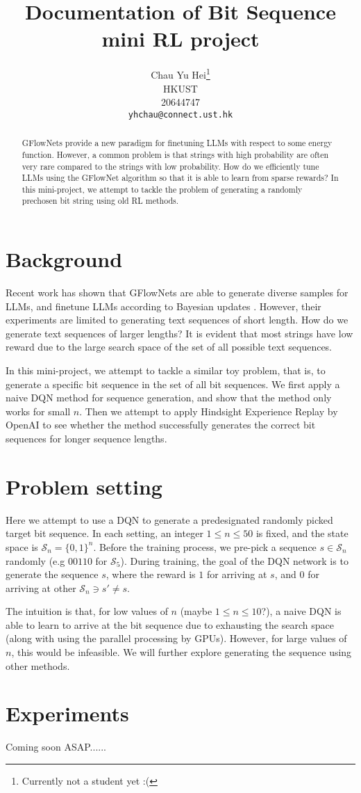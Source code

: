 \documentclass{article}
\title{Documentation of Bit Sequence mini RL project}
\author{%
  Chau Yu Hei\thanks{Currently not a student yet :(} \\
  HKUST\\
  20644747\\
  \texttt{yhchau@connect.ust.hk} \\
}
\begin{document}
\maketitle


\begin{abstract}
GFlowNets provide a new paradigm for finetuning LLMs with respect to some energy function. However, a common problem is that strings with high probability are often very rare compared to the strings with low probability. How do we efficiently tune LLMs using the GFlowNet algorithm so that it is able to learn from sparse rewards? In this mini-project, we attempt to tackle the problem of generating a randomly prechosen bit string using old RL methods.
\end{abstract}


\section{Background}
Recent work has shown that GFlowNets are able to generate diverse samples for LLMs, and finetune LLMs according to Bayesian updates \cite{hu_llm}. However, their experiments are limited to generating text sequences of short length. How do we generate text sequences of larger lengths? It is evident that most strings have low reward due to the large search space of the set of all possible text sequences.

In this mini-project, we attempt to tackle a similar toy problem, that is, to generate a specific bit sequence in the set of all bit sequences. We first apply a naive DQN method for sequence generation, and show that the method only works for small $n$. Then we attempt to apply Hindsight Experience Replay \cite{hindsight_openai} by OpenAI to see whether the method successfully generates the correct bit sequences for longer sequence lengths.

\section{Problem setting}
Here we attempt to use a DQN to generate a predesignated randomly picked target bit sequence. In each setting, an integer $1 \leq n \leq 50$ is fixed, and the state space is $\mathcal{S}_n=\{0,1\}^n$. Before the training process, we pre-pick a sequence $s \in \mathcal{S}_n$ randomly (e.g $00110$ for $\mathcal{S}_5$). During training, the goal of the DQN network is to generate the sequence $s$, where the reward is $1$ for arriving at $s$, and $0$ for arriving at other $\mathcal{S}_n \ni s' \neq s$. 

The intuition is that, for low values of $n$ (maybe $1 \leq n \leq 10$?), a naive DQN is able to learn to arrive at the bit sequence due to exhausting the search space (along with using the parallel processing by GPUs). However, for large values of $n$, this would be infeasible. We will further explore generating the sequence using other methods.


\section{Experiments}
Coming soon ASAP......



\end{document}
